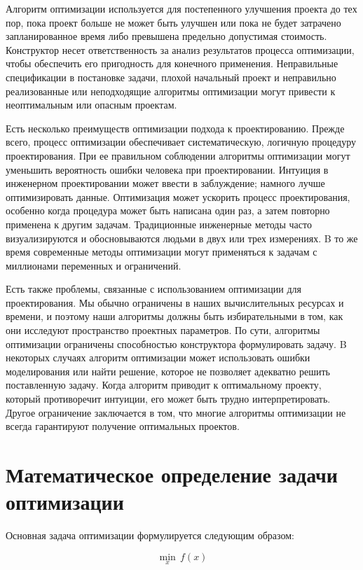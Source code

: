 Алгоритм оптимизации используется для постепенного улучшения проекта до тех пор, пока проект больше не может быть улучшен или пока не будет затрачено запланированное время либо превышена предельно допустимая стоимость. Конструктор несет ответственность за анализ результатов процесса оптимизации, чтобы обеспечить его пригодность для конечного применения. Неправильные спецификации в постановке задачи, плохой начальный проект и неправильно реализованные или неподходящие алгоритмы оптимизации могут привести к неоптимальным или опасным проектам.

Есть несколько преимуществ оптимизации подхода к проектированию. Прежде всего, процесс оптимизации обеспечивает систематическую, логичную процедуру проектирования. При ее правильном соблюдении алгоритмы оптимизации могут уменьшить вероятность ошибки человека при проектировании. Интуиция в инженерном проектировании может ввести в заблуждение; намного лучше оптимизировать данные. Оптимизация может ускорить процесс проектирования, особенно когда процедура может быть написана один раз, а затем повторно применена к другим задачам. Традиционные инженерные методы часто визуализируются и обосновываются людьми в двух или трех измерениях. B то же время современные методы оптимизации могут применяться к задачам с миллионами переменных и ограничений.
   
Есть также проблемы, связанные с использованием оптимизации для проектирования. Мы обычно ограничены в наших вычислительных ресурсах и времени, и поэтому наши алгоритмы должны быть избирательными в том, как они исследуют пространство проектных параметров. По сути, алгоритмы оптимизации ограничены способностью конструктора формулировать задачу. B некоторых случаях алгоритм оптимизации может использовать ошибки моделирования или найти решение, которое не позволяет адекватно решить поставленную задачу. Когда алгоритм приводит к оптимальному проекту, который противоречит интуиции, его может быть трудно интерпретировать. Другое ограничение заключается в том, что многие алгоритмы оптимизации не всегда гарантируют получение оптимальных проектов. 

\section{Математическое определение задачи оптимизации}

Основная задача оптимизации формулируется следующим образом:

\begin{equation}
  \min_{x} \, f(x) 
\end{equation}


